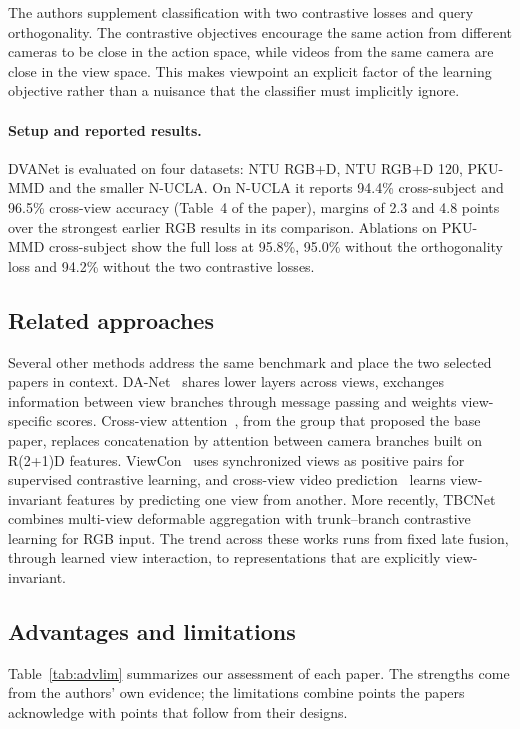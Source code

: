 \documentclass[runningheads]{llncs}
\begin{document}
The authors supplement classification with two contrastive losses and query orthogonality. The contrastive objectives encourage the same action from different cameras to be close in the action space, while videos from the same camera are close in the view space. This makes viewpoint an explicit factor of the learning objective rather than a nuisance that the classifier must implicitly ignore.

\paragraph{Setup and reported results.} DVANet is evaluated on four datasets: NTU RGB+D, NTU RGB+D 120, PKU-MMD and the smaller N-UCLA. On N-UCLA it reports 94.4\% cross-subject and 96.5\% cross-view accuracy (Table~4 of the paper), margins of 2.3 and 4.8 points over the strongest earlier RGB results in its comparison. Ablations on PKU-MMD cross-subject show the full loss at 95.8\%, 95.0\% without the orthogonality loss and 94.2\% without the two contrastive losses.

\subsection{Related approaches}
Several other methods address the same benchmark and place the two selected papers in context. DA-Net~\cite{danet} shares lower layers across views, exchanges information between view branches through message passing and weights view-specific scores. Cross-view attention~\cite{cva}, from the group that proposed the base paper, replaces concatenation by attention between camera branches built on R(2+1)D features. ViewCon~\cite{viewcon} uses synchronized views as positive pairs for supervised contrastive learning, and cross-view video prediction~\cite{vyas} learns view-invariant features by predicting one view from another. More recently, TBCNet~\cite{tbcnet} combines multi-view deformable aggregation with trunk--branch contrastive learning for RGB input. The trend across these works runs from fixed late fusion, through learned view interaction, to representations that are explicitly view-invariant.

\subsection{Advantages and limitations}
Table~\ref{tab:advlim} summarizes our assessment of each paper. The strengths come from the authors' own evidence; the limitations combine points the papers acknowledge with points that follow from their designs.
\end{document}
